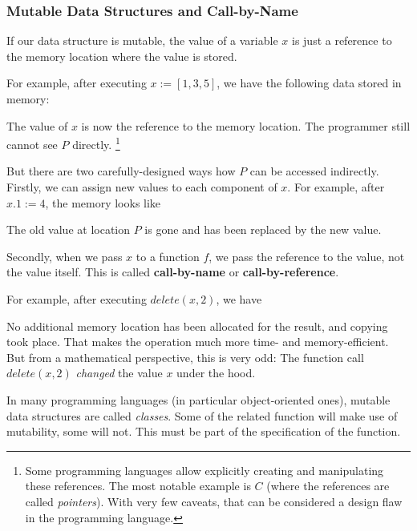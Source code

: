\subsubsection{Mutable Data Structures and Call-by-Name}

If our data structure is mutable, the value of a variable $x$ is just a reference to the memory location where the value is stored.

For example, after executing $x:=[1,3,5]$, we have the following data stored in memory:
\begin{amemory}
\alocations
{}
\end{amemory}
The value of $x$ is now the reference to the memory location.
The programmer still cannot see $P$ directly.%
\footnote{Some programming languages allow explicitly creating and manipulating these references.
The most notable example is $C$ (where the references are called \emph{pointers}).
With very few caveats, that can be considered a design flaw in the programming language.}

But there are two carefully-designed ways how $P$ can be accessed indirectly.
Firstly, we can assign new values to each component of $x$.
For example, after $x.1:=4$, the memory looks like
\begin{amemory}
\alocations
{}
\end{amemory}
The old value at location $P$ is gone and has been replaced by the new value.

Secondly, when we pass $x$ to a function $f$, we pass the reference to the value, not the value itself.
This is called \textbf{call-by-name} or \textbf{call-by-reference}.

For example, after executing $delete(x,2)$, we have
\begin{amemory}
\alocations
{}
\end{amemory}
No additional memory location has been allocated for the result, and copying took place.
That makes the operation much more time- and memory-efficient.
But from a mathematical perspective, this is very odd: The function call $delete(x,2)$ \emph{changed} the value $x$ under the hood.
\medskip

In many programming languages (in particular object-oriented ones), mutable data structures are called \emph{classes}.
Some of the related function will make use of mutability, some will not.
This must be part of the specification of the function.

